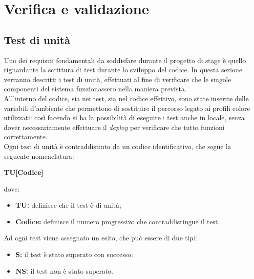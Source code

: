 \chapter{Verifica e validazione}
\label{cap:verifica-validazione}


\section{Test di unità}

Uno dei requisiti fondamentali da soddisfare durante il progetto di stage è
quello riguardante la scrittura di test durante lo sviluppo del codice. In
questa sezione verranno descritti i test di unità, effettuati al fine di
verificare che le singole componenti del sistema funzionassero nella maniera prevista. \\
All'interno del codice, sia nei test, sia nel codice effettivo, sono state
inserite delle variabili d'ambiente che permettono di sostituire il percorso
legato ai profili colore utilizzati: così facendo si ha la possibilità di
eseguire i test anche in locale, senza dover necessariamente effettuare il
\emph{deploy} per verificare che tutto funzioni correttamente.\\
Ogni test di unità è contraddistinto da un codice identificativo, che segue la
seguente nomenclatura:
\begin{center}
    \textbf{TU[Codice]}
\end{center}
dove:
\begin{itemize}
    \item \textbf{TU:} definisce che il test è di unità;
    \item \textbf{Codice:} definisce il numero progressivo che contraddistingue il test.
\end{itemize}

Ad ogni test viene assegnato un esito, che può essere di due tipi:
\begin{itemize}
    \item \textbf{S:} il test è stato superato con successo;
    \item \textbf{NS:} il test non è stato superato.
\end{itemize}


